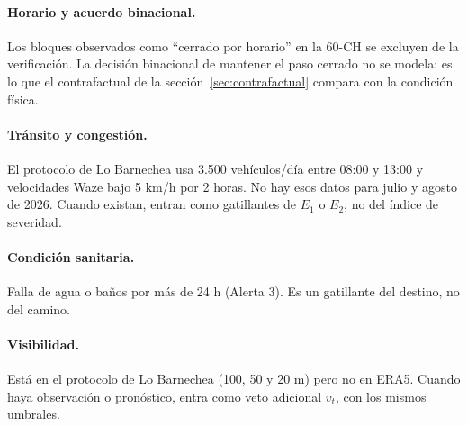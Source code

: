 
\paragraph{Horario y acuerdo binacional.} Los bloques observados como ``cerrado por horario'' en la 60-CH se excluyen de la verificación. La decisión binacional de mantener el paso cerrado no se modela: es lo que el contrafactual de la sección~\ref{sec:contrafactual} compara con la condición física.

\paragraph{Tránsito y congestión.} El protocolo de Lo Barnechea usa 3.500 vehículos/día entre 08:00 y 13:00 y velocidades Waze bajo 5 km/h por 2 horas. No hay esos datos para julio y agosto de 2026. Cuando existan, entran como gatillantes de $E_1$ o $E_2$, no del índice de severidad.

\paragraph{Condición sanitaria.} Falla de agua o baños por más de 24 h (Alerta 3). Es un gatillante del destino, no del camino.

\paragraph{Visibilidad.} Está en el protocolo de Lo Barnechea (100, 50 y 20 m) pero no en ERA5. Cuando haya observación o pronóstico, entra como veto adicional $v_t$, con los mismos umbrales.
